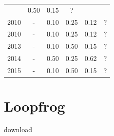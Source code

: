 \begin{table}[H]
\begin{tabular}{| l | c | c | c | c | c |}
          &
          0.50
          &
            {\color{red} 0.15}
          &
          ?
          \\
            2010
          &
          -
          &
          0.10
          &
          0.25
          &
            {\color{red} 0.12}
          &
          ?
          \\
            2010
          &
          -
          &
          0.10
          &
          0.25
          &
            {\color{red} 0.12}
          &
          ?
          \\
\hline
            2013
          &
          -
          &
          0.10
          &
          0.50
          &
            {\color{red} 0.15}
          &
          ?
          \\
\hline
            2014
          &
          -
          &
          0.50
          &
          0.25
          &
            {\color{blue} 0.62}
          &
          ?
          \\
\hline
            2015
          &
          -
          &
          0.10
          &
          0.50
          &
            {\color{red} 0.15}
          &
          ?
          \\
\hline
\end{tabular}
\end{table}



\section{Loopfrog}
\checkmark download



